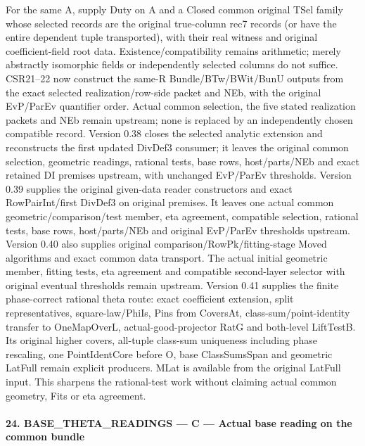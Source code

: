 For the same A, supply Duty on A and a Closed common original TSel family whose selected records are the original true-column rec7 records (or have the entire dependent tuple transported), with their real witness and original coefficient-field root data. Existence/compatibility remains arithmetic; merely abstractly isomorphic fields or independently selected columns do not suffice. CSR21–22 now construct the same-R Bundle/BTw/BWit/BunU outputs from the exact selected realization/row-side packet and NEb, with the original EvP/ParEv quantifier order. Actual common selection, the five stated realization packets and NEb remain upstream; none is replaced by an independently chosen compatible record. Version 0.38 closes the selected analytic extension and reconstructs the first updated DivDef3 consumer; it leaves the original common selection, geometric readings, rational tests, base rows, host/parts/NEb and exact retained DI premises upstream, with unchanged EvP/ParEv thresholds. Version 0.39 supplies the original given-data reader constructors and exact RowPairInt/first DivDef3 on original premises. It leaves one actual common geometric/comparison/test member, eta agreement, compatible selection, rational tests, base rows, host/parts/NEb and original EvP/ParEv thresholds upstream. Version 0.40 also supplies original comparison/RowPk/fitting-stage Moved algorithms and exact common data transport. The actual initial geometric member, fitting tests, eta agreement and compatible second-layer selector with original eventual thresholds remain upstream. Version 0.41 supplies the finite phase-correct rational theta route: exact coefficient extension, split representatives, square-law/PhiIs, Pins from CoversAt, class-sum/point-identity transfer to OneMapOverL, actual-good-projector RatG and both-level LiftTestB. Its original higher covers, all-tuple class-sum uniqueness including phase rescaling, one PointIdentCore before O, base ClassSumsSpan and geometric LatFull remain explicit producers. MLat is available from the original LatFull input. This sharpens the rational-test work without claiming actual common geometry, Fits or eta agreement.



\paragraph{24. BASE\_\allowbreak THETA\_\allowbreak READINGS — C — Actual base reading on the common bundle}

